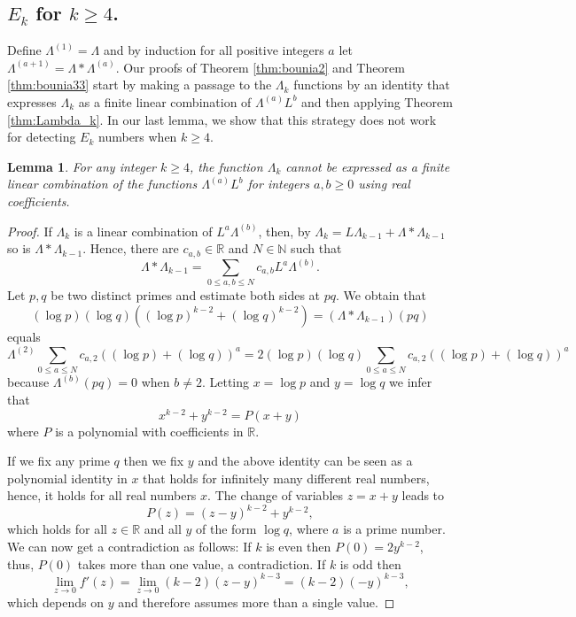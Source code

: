\documentclass[reqno, 11pt]{amsart}
\numberwithin{equation}{section}
\newtheorem{lemma}[theorem]{Lemma}
\theoremstyle{definition}
\newcommand{\0}{\mathbf{0}}
\renewcommand{\leq}{\leqslant}
\renewcommand{\geq}{\geqslant}
\renewcommand{\leq}{\leqslant}
\renewcommand{\geq}{\geqslant}
\renewcommand{\#}{\sharp}
\begin{document}
\subsection{$E_k$ for $k\geq 4$.}
Define $\Lambda^{(1)}=\Lambda$ and by induction for all positive integers $a$ let $\Lambda^{(a+1)}= \Lambda \ast \Lambda^{(a)}$.
Our proofs of Theorem \ref{thm:bounia2}  and
Theorem \ref{thm:bounia33}
start by making a passage to the $\Lambda_k$ 
functions by an identity that expresses $\Lambda_k$ as a finite linear 
combination of $\Lambda^{(a)}L^b$ and then applying Theorem \ref{thm:Lambda_k}. In our last 
lemma, we show that this strategy does not work for detecting
$E_k$ numbers 
when $k \geq 4$.
\begin{lemma} \label{paparity}For any integer $k \geq 4$, 
the  function $\Lambda_k$ cannot be expressed as a finite linear combination of the functions $\Lambda^{(a)}L^b$ for integers 
$a,b\geq 0$
using real coefficients.
\end{lemma}
\begin{proof}  If $\Lambda_k$ is a  
linear combination of 
$L^a \Lambda^{(b)}$, then, by 
$\Lambda_k=L \Lambda_{k-1} + \Lambda \ast \Lambda_{k-1}$
so is $\Lambda \ast \Lambda_{k-1}$.
Hence, there are $c_{a,b}\in \mathbb R$ and $N\in \mathbb N$ 
such that 
$$\Lambda \ast \Lambda_{k-1} = \sum_{0\leq a,b \leq N} c_{a,b}
L^a \Lambda^{(b)}.$$ Let $p,q$ be two distinct primes
and estimate both sides at $pq$. We obtain that 
$$ (\log p)(\log q)((\log p)^{k-2} + (\log q)^{k-2})
 =
 (\Lambda \ast \Lambda_{k-1})(pq)$$ equals $$
 \Lambda^{(2)}
\sum_{0\leq a \leq N} c_{a,2} ( (\log p)+(\log q))^a 
=2 (\log p)(\log q)
\sum_{0\leq a \leq N} c_{a,2} ( (\log p)+(\log q))^a$$
because $\Lambda^{(b)}(pq)=0$ when $b\neq 2 $. Letting 
$x=\log p$ and $ y=\log q$ we infer that $$x^{k-2} + y^{k-2}= P(x+y)
$$ where $P$ is a polynomial with coefficients in $\mathbb R$.  


If we fix any prime $q$ then we fix $y$
and the above identity can be seen 
as a polynomial identity in $x$ that holds for infinitely many 
different real numbers, hence, it holds for all real numbers $x$.
The change of variables  $z=x+y$ leads to  
$$P(z)=(z-y)^{k-2}+ y^{k-2},$$ which holds for all $z\in \mathbb R$ 
and all $y$ of the form $\log q$, where $a$ is a prime number.
We can now get a contradiction as follows:
If $k$ is even then $P(0)= 2 y^{k-2}$, 
thus, $P(0)$ takes more than one value,
a contradiction. If $k$ is odd   
then 
$$ \lim_{z\to 0} f'(z)=\lim_{z\to 0} 
(k-2)(z-y)^{k-3}
=(k-2)(-y)^{k-3},$$
which depends on $y$ and   therefore assumes more than 
a single value.\end{proof}
\end{document}
